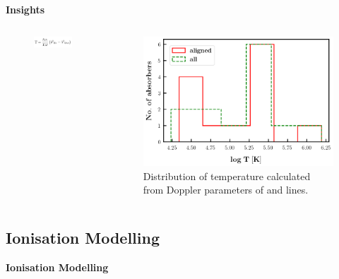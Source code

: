 \documentclass[aspectratio=169,draft]{beamer}
\newcommand\ion[2]{\text{#1\,\textsc{\lowercase{#2}}}}
\begin{document}
\begin{frame}[noframenumbering]{\huge{{\textbf{Insights}}}}


\begin{columns}
  \begin{column}{0.2\textwidth} 
    \vspace*{-18mm}
    \begin{figure}[!htbp]
      \centering
      \includegraphics[width=3.5cm]{Figures/T.png}
    \end{figure}
    
    
  \end{column}      

  \begin{column}{0.8\textwidth}

    \vspace*{-5mm}

    \begin{figure}[!htbp]
      \centering
      \includegraphics[width=9cm]{Figures/T_histogram.png}
      \vspace*{-1mm}
      \caption{Distribution of temperature calculated from Doppler parameters of \ion{H}{i} and \ion{O}{vi} lines.}
    \end{figure}
  \end{column}

\end{columns}



\end{frame}


\begin{frame}{}

\section{Ionisation Modelling}

\vspace*{1cm}

{\huge{\textbf{Ionisation Modelling}}}

\end{frame}
\end{document}
